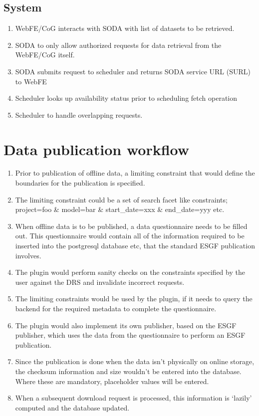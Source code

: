 \documentclass[oneside,12pt]{memoir}
\begin{document}
\subsection{System}
\begin{enumerate}
\item WebFE/CoG interacts with SODA with list of datasets to be retrieved.
\item SODA to only allow authorized requests for data retrieval from the WebFE/CoG itself.
\item SODA submits request to scheduler and returns SODA service URL (SURL) to WebFE  
\item Scheduler looks up availability status prior to scheduling fetch operation
\item Scheduler to handle overlapping requests.
\end{enumerate}
\section{Data publication workflow}
\begin{enumerate}
\item Prior to publication of offline data, a limiting constraint that would define the boundaries for the publication is specified. 
\item The limiting constraint could be a set of search facet like constraints; project=foo \& model=bar \& start\_date=xxx \& end\_date=yyy etc.
\item When offline data is to be published, a data questionnaire needs to be filled out. This questionnaire would contain all of the information required to be inserted into the postgresql database etc, that the standard ESGF publication involves. 
\item The plugin would perform sanity checks on the constraints specified by the user against the DRS and invalidate incorrect requests.
\item The limiting constraints would be used by the plugin, if it needs to query the backend for the required metadata to complete the questionnaire.
\item The plugin would also implement its own publisher, based on the ESGF publisher, which uses the data from the questionnaire to perform an ESGF publication.
\item Since the publication is done when the data isn't physically on online storage, the checksum information and size wouldn't be entered into the database. Where these are mandatory, placeholder values will be entered.
\item When a subsequent download request is processed, this information is `lazily' computed and the database updated. 
\end{enumerate}
\appendix
{}
\setcounter{secnumdepth}{0}
\end{document}
